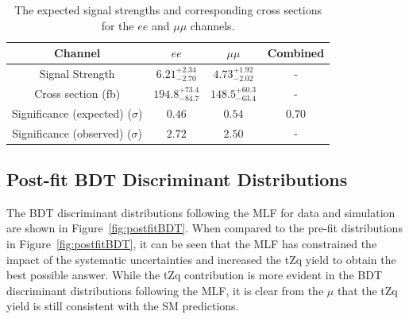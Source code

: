 \begin{table}[!h]
   \centering
   \caption{The expected signal strengths and corresponding cross sections for
   the $ee$ and $\mu\mu$ channels.}
   \begin{tabular}{cccc}
       \hline
       Channel & $ee$ & $\mu\mu$ & Combined \\
        \hline
       Signal Strength & $6.21_{-2.70}^{+2.34}$ & $4.73_{-2.02}^{+1.92}$ & - \\
       Cross section (fb) & $194.8_{-84.7}^{+73.4}$ & $148.5_{-63.4}^{+60.3}$ & - \\
       Significance (expected) ($\sigma$) & $0.46$ & $0.54$ & $0.70$\\
       Significance (observed) ($\sigma$) & $2.72$ & $2.50$ & - \\
    \end{tabular}
   \label{tab:shapetxs}
\end{table}
%


\subsection{Post-fit BDT Discriminant Distributions}
The BDT discriminant distributions following the MLF for data and simulation are shown in Figure~\ref{fig:postfitBDT}.
When compared to the pre-fit distributions in Figure~\ref{fig:postfitBDT}, it can be seen that the MLF has constrained the impact of the systematic uncertainties and increased the tZq yield to obtain the best possible answer.
While the tZq contribution is more evident in the BDT discriminant distributions following the MLF, it is clear from the $\mu$ that the tZq yield is still consistent with the SM predictions.

